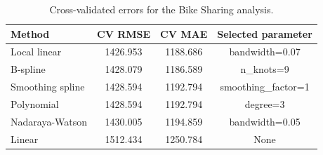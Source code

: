 \begin{table}[H]
\centering
\caption{Cross-validated errors for the Bike Sharing analysis.}
\label{tab:bike-cv}
\small
\begin{tabular}{lccc}
\toprule
Method & CV RMSE & CV MAE & Selected parameter \\
\midrule
Local linear & 1426.953 & 1188.686 & bandwidth=0.07 \\
B-spline & 1428.079 & 1186.589 & n\_knots=9 \\
Smoothing spline & 1428.594 & 1192.794 & smoothing\_factor=1 \\
Polynomial & 1428.594 & 1192.794 & degree=3 \\
Nadaraya-Watson & 1430.005 & 1194.859 & bandwidth=0.05 \\
Linear & 1512.434 & 1250.784 & None \\
\bottomrule
\end{tabular}
\end{table}
